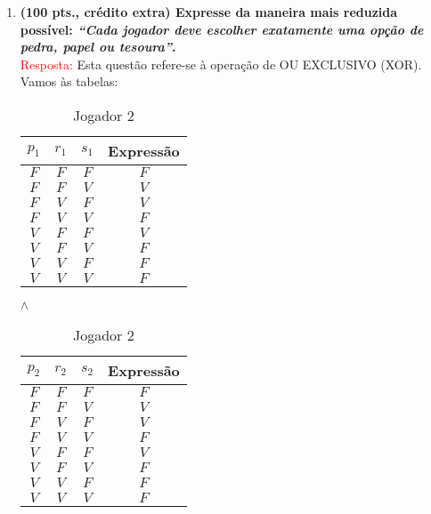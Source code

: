 \documentclass[a4paper,12pt]{article}
\begin{document}
\begin{enumerate}
\begin{enumerate}
 
\item {\bf(100 pts., crédito extra) Expresse da maneira mais reduzida possível: \textit{``Cada jogador deve escolher exatamente  uma opção de pedra, papel ou tesoura''}.}\\

\textcolor{red}{Resposta:} Esta questão refere-se à operação de OU EXCLUSIVO (XOR). Vamos às tabelas:

\begin{table}[htb]
\begin{center}
\begin{minipage}[htb]{0.4\linewidth}
\centering
 \begin{tabular}{|c|c|c|c|}
  \hline	
  \rowcolor[rgb]{0.9,0.9,0.9} { $p_1$} & { $r_1$} & { $s_1$} & {\bf Expressão} \\ \hline
   $F$   & $F$   & $F$   & $F$ \\ \hline
  \rowcolor[rgb]{1,0.2,0.2} $F$   & $F$   & $V$   & $V$ \\ \hline
  \rowcolor[rgb]{1,0.2,0.2} $F$   & $V$   & $F$   & $V$ \\ \hline
   $F$   & $V$   & $V$   & $F$ \\ \hline
  \rowcolor[rgb]{1,0.2,0.2} $V$   & $F$   & $F$   & $V$ \\ \hline
   $V$   & $F$   & $V$   & $F$ \\ \hline
   $V$   & $V$   & $F$   & $F$ \\ \hline
   $V$   & $V$   & $V$   & $F$ \\ \hline
\end{tabular}
\caption{Jogador 1}
\label{4c1}
\end{minipage}
$\wedge$
\begin{minipage}[htb]{0.4\linewidth}
\centering
 \begin{tabular}{|c|c|c|c|}
  \hline	
  \rowcolor[rgb]{0.9,0.9,0.9} { $p_2$} & { $r_2$} & { $s_2$} & {\bf Expressão} \\ \hline
   $F$   & $F$   & $F$   & $F$ \\ \hline
  \rowcolor[rgb]{1,0.2,0.2} $F$   & $F$   & $V$   & $V$ \\ \hline
  \rowcolor[rgb]{1,0.2,0.2} $F$   & $V$   & $F$   & $V$ \\ \hline
   $F$   & $V$   & $V$   & $F$ \\ \hline
  \rowcolor[rgb]{1,0.2,0.2} $V$   & $F$   & $F$   & $V$ \\ \hline
   $V$   & $F$   & $V$   & $F$ \\ \hline
   $V$   & $V$   & $F$   & $F$ \\ \hline
   $V$   & $V$   & $V$   & $F$ \\ \hline
\end{tabular}
\caption{Jogador 2}
\label{4c2}
\end{minipage}
\end{center}
\end{table}



\end{enumerate}
\end{enumerate}
\end{document}
